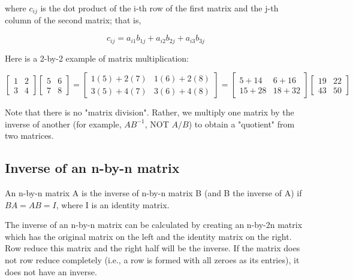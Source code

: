 where $c _{ij}$ is the dot product of the i-th row of the first matrix and the j-th column
of the second matrix; that is,

$$c _{ij} = a _{i1}b _{1j} + a _{i2}b _{2j} + a _{i3}b _{3j}$$



Here is a 2-by-2 example of matrix multiplication:


$$
\begin{bmatrix}
1 & 2 \\
3 & 4
\end{bmatrix}
\begin{bmatrix}
5 & 6 \\
7 & 8
\end{bmatrix} =
\begin{bmatrix}
1(5) + 2(7) & 1(6) + 2(8) \\
3(5) + 4(7) & 3(6) + 4(8)
\end{bmatrix} =
\begin{bmatrix}
5 + 14 & 6 + 16 \\
15 + 28 & 18 + 32
\end{bmatrix}
\begin{bmatrix}
19 & 22 \\
43 & 50
\end{bmatrix}
$$



Note that there is no "matrix division". Rather, we multiply one matrix by the inverse of
another (for example, $AB^{-1}$, NOT $A/B$) to obtain a "quotient" from two matrices.




\subsection{Inverse of an n-by-n matrix}
\label{sss:inve-1459}




An n-by-n matrix A is the inverse of n-by-n matrix B (and B the inverse of A) if $BA = AB
= I$, where I is an identity matrix.



The inverse of an n-by-n matrix can be calculated by creating an n-by-2n matrix which has
the original matrix on the left and the identity matrix on the right. Row reduce this
matrix and the right half will be the inverse. If the matrix does not row reduce
completely (i.e., a row is formed with all zeroes as its entries), it does not have an
inverse.





